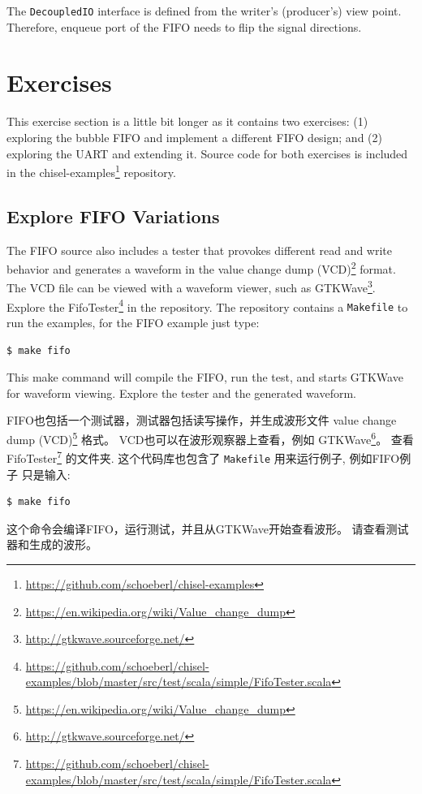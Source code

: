 \documentclass[%
    10pt,
    headinclude, footexclude,
    openright, %
    notitlepage,
    cleardoubleempty,
    headsepline,
    pointlessnumbers,
    bibtotoc, idxtotoc,
    ]{scrbook}
\newcommand{\code}[1]{{\small{\texttt{#1}}}}
\newcommand{\myref}[2]{\href{#1}{#2}}
\renewcommand{\myref}[2]{{#2}{\footnote{\url{#1}}}}
\begin{document}

\noindent The \code{DecoupledIO} interface is defined from the writer's (producer's) view point.
Therefore, enqueue port of the FIFO needs to flip the signal directions.

\section{Exercises}

This exercise section is a little bit longer as it contains two exercises:
(1) exploring the bubble FIFO and implement a different FIFO design;
and (2) exploring the UART and extending it.
Source code for both exercises is included in the
\myref{https://github.com/schoeberl/chisel-examples}{chisel-examples} repository.

\subsection{Explore FIFO Variations}

The FIFO source also includes a tester that provokes different read and write behavior and generates a waveform in the 
\myref{https://en.wikipedia.org/wiki/Value_change_dump}{value change dump (VCD)} format.
The VCD file can be viewed with a waveform viewer, such as
\myref{http://gtkwave.sourceforge.net/}{GTKWave}.
Explore the
\myref{https://github.com/schoeberl/chisel-examples/blob/master/src/test/scala/simple/FifoTester.scala}{FifoTester} in the repository.
The repository contains a \code{Makefile} to run the examples, for the FIFO example
just type:
\begin{verbatim}
$ make fifo
\end{verbatim}
This make command will compile the FIFO, run the test, and starts GTKWave for waveform
viewing. Explore the tester and the generated waveform.

FIFO也包括一个测试器，测试器包括读写操作，并生成波形文件
\myref{https://en.wikipedia.org/wiki/Value_change_dump}{value change dump (VCD)} 格式。
VCD也可以在波形观察器上查看，例如
\myref{http://gtkwave.sourceforge.net/}{GTKWave}。
查看
\myref{https://github.com/schoeberl/chisel-examples/blob/master/src/test/scala/simple/FifoTester.scala}{FifoTester} 的文件夹.
这个代码库也包含了 \code{Makefile} 用来运行例子, 例如FIFO例子
只是输入:
\begin{verbatim}
$ make fifo
\end{verbatim}
这个命令会编译FIFO，运行测试，并且从GTKWave开始查看波形。
请查看测试器和生成的波形。
\end{document}
